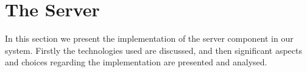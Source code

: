 \section{The Server}\label{sec:the_server}
In this section we present the implementation of the server component in our system.
Firstly the technologies used are discussed, and then significant aspects and choices regarding the implementation are presented and analysed.
